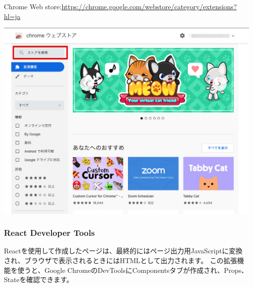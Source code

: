 Chrome Web store:\url{https://chrome.google.com/webstore/category/extensions?hl=ja}

\begin{reviewimage}[H]%
\includegraphics[width=1.0\maxwidth]{./images/01-createDevEnv/01_13chromeWebstore.png}%
\label{image:01-createDevEnv:01_13chromeWebstore}
\end{reviewimage}

\clearpage


\subsubsection*{React Developer Tools}
\keeplastskip{
  \label{sec:1-3-1-2}
  \par\nobreak
}

Reactを使用して作成したページは、最終的にはページ出力用JavaScriptに変換され、ブラウザで表示されるときにはHTMLとして出力されます。
この拡張機能を使うと、Google ChromeのDevToolsにComponentsタブが作成され、Props、Stateを確認できます。

